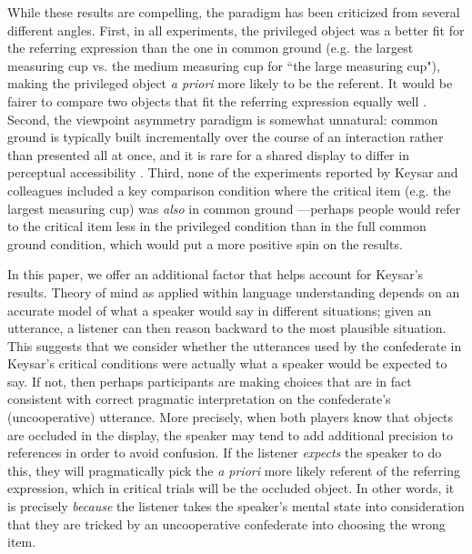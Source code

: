 \documentclass[10pt,letterpaper]{article}
\begin{document}
While these results are compelling, the paradigm has been criticized from several different angles. First, in all experiments, the privileged object was a better fit for the referring expression than the one in common ground (e.g. the largest measuring cup vs. the medium measuring cup for ``the large measuring cup"), making the privileged object \emph{a priori} more likely to be the referent. It would be fairer to compare two objects that fit the referring expression equally well \cite{HellerGrodnerTanenhaus08_Perspective}. Second, the viewpoint asymmetry paradigm is somewhat unnatural: common ground is typically built incrementally over the course of an interaction rather than presented all at once, and it is rare for a shared display to differ in perceptual accessibility \cite{HannaTanenhausTrueswell03_CommonGroundPerspective}. Third, none of the experiments reported by Keysar and colleagues included a key comparison condition where the critical item (e.g. the largest measuring cup) was \emph{also} in common ground \cite{BrownSchmidtHanna11_IncrementalPerspectiveTaking}---perhaps people would refer to the critical item less in the privileged condition than in the full common ground condition, which would put a more positive spin on the results. %

In this paper, we offer an additional factor that helps account for Keysar's results. 
Theory of mind as applied within language understanding depends on an accurate model of what a speaker would say in different situations; given an utterance, a listener can then reason backward to the most plausible situation.
This suggests that we consider whether the utterances used by the confederate in Keysar's critical conditions were actually what a speaker would be expected to say. 
If not, then perhaps participants are making choices that are in fact consistent with correct pragmatic interpretation on the confederate's (uncooperative) utterance.
More precisely, when both players know that objects are occluded in the display, the speaker may tend to add additional precision to references in order to avoid confusion. If the listener \emph{expects} the speaker to do this, they will pragmatically pick the \emph{a priori} more likely referent of the referring expression, which in critical trials will be the occluded object. In other words, it is precisely \emph{because} the listener takes the speaker's mental state into consideration that they are tricked by an uncooperative confederate into choosing the wrong item. 
\end{document}
